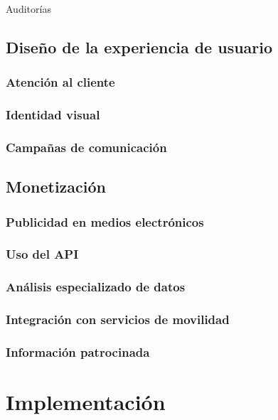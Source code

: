 \documentclass{report}
\begin{document}
Auditorías

\section{Diseño de la experiencia de usuario}
\label{S:experiencia}

\subsection{Atención al cliente}

\subsection{Identidad visual}

\subsection{Campañas de comunicación}

\section{Monetización}
\label{S:monetizacion}

\subsection{Publicidad en medios electrónicos}

\subsection{Uso del API}

\subsection{Análisis especializado de datos}

\subsection{Integración con servicios de movilidad}

\subsection{Información patrocinada}

\chapter{Implementación}
\end{document}

